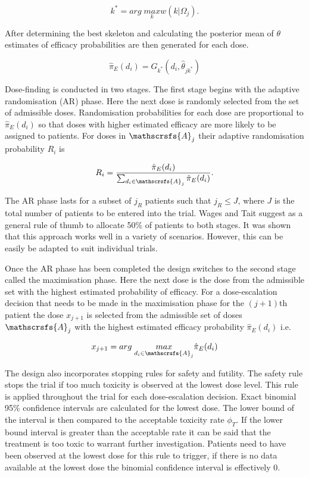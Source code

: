 \begin{equation}
	k^* = arg \; \underset{k}{max}w(k|\Omega_j).
\end{equation}

After determining the best skeleton and calculating the posterior mean of $\theta$ estimates of efficacy probabilities are then generated for each dose. 

\begin{equation}
	\hat{\pi}_E(d_i) = G_{k^*} (d_i, \hat{\theta}_{jk^*})
\end{equation}

Dose-finding is conducted in two stages. The first stage begins with the adaptive randomisation (AR) phase. Here the next dose is randomly selected from the set of admissible doses. Randomisation probabilities for each dose are proportional to $\hat{\pi}_E(d_i)$ so that doses with higher estimated efficacy are more likely to be assigned to patients. For doses in $\mathscrsfs{A}_j$ their adaptive randomisation probability $R_i$ is 

\begin{equation}
	\label{WT:eq_WT-ARprob}
	R_i = \frac{\hat{\pi}_E(d_i)}{\sum_{d_i \in \mathscrsfs{A}_j}\hat{\pi}_E(d_i)}. 
\end{equation}

The AR phase lasts for a subset of $j_R$ patients such that $j_R \leq J$, where $J$ is the total number of patients to be entered into the trial. Wages and Tait suggest as a general rule of thumb to allocate 50\% of patients to both stages. It was shown that this approach works well in a variety of scenarios. However, this can be easily be adapted to suit individual trials. 

Once the AR phase has been completed the design switches to the second stage called the maximisation phase. Here the next dose is the dose from the admissible set with the highest estimated probability of efficacy. For a dose-escalation decision that needs to be made in the maximisation phase for the $(j+1)$th patient the dose $x_{j+1}$ is selected from the admissible set of doses $\mathscrsfs{A}_j$ with the highest estimated efficacy probability $\hat{\pi}_E(d_i)$ i.e. 

\begin{equation}
	x_{j+1} = arg \; \underset{d_i \in \mathscrsfs{A}_j}{max}\hat{\pi}_E(d_i)
\end{equation}

The design also incorporates stopping rules for safety and futility. The safety rule stops the trial if too much toxicity is observed at the lowest dose level. This rule is applied throughout the trial for each dose-escalation decision. Exact binomial 95\% confidence intervals are calculated for the lowest dose. The lower bound of the interval is then compared to the acceptable toxicity rate $\phi_T$. If the lower bound interval is greater than the acceptable rate it can be said that the treatment is too toxic to warrant further investigation. Patients need to have been observed at the lowest dose for this rule to trigger, if there is no data available at the lowest dose the binomial confidence interval is effectively 0. 

